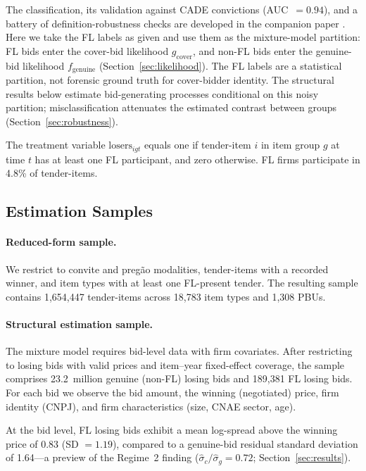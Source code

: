 The classification, its validation against CADE convictions
(AUC~$= 0.94$), and a battery of definition-robustness checks are
developed in the companion paper
\citep{genicolomartins2026screening}. Here we take the FL labels as given and use them as the
mixture-model partition: FL bids enter the cover-bid likelihood
$g_{\text{cover}}$, and non-FL bids enter the genuine-bid
likelihood $f_{\text{genuine}}$ (Section~\ref{sec:likelihood}).
The FL labels are a statistical partition, not forensic ground
truth for cover-bidder identity. The structural results below
estimate bid-generating processes conditional on this noisy
partition; misclassification attenuates the estimated contrast
between groups (Section~\ref{sec:robustness}).

The treatment variable $\text{losers}_{igt}$ equals one if
tender-item $i$ in item group $g$ at time $t$ has at least one FL
participant, and zero otherwise. FL firms participate in 4.8\% of
tender-items.

\subsection{Estimation Samples}
\label{sec:samples}

\paragraph{Reduced-form sample.}
We restrict to convite and preg\~ao modalities, tender-items with a
recorded winner, and item types with at least one FL-present tender.
The resulting sample contains 1,654,447 tender-items across 18,783
item types and 1,308 PBUs.

\paragraph{Structural estimation sample.}
The mixture model requires bid-level data with firm covariates. After
restricting to losing bids with valid prices and item--year
fixed-effect coverage, the sample comprises 23.2~million genuine
(non-FL) losing bids and 189,381 FL losing bids. For each bid we
observe the bid amount, the winning (negotiated) price, firm identity
(CNPJ), and firm characteristics (size, CNAE sector, age).

At the bid level, FL losing bids exhibit a mean log-spread above the
winning price of 0.83 (SD $= 1.19$), compared to a genuine-bid
residual standard deviation of 1.64---a preview of the Regime~2
finding ($\hat{\sigma}_c / \hat{\sigma}_g = 0.72$;
Section~\ref{sec:results}).


